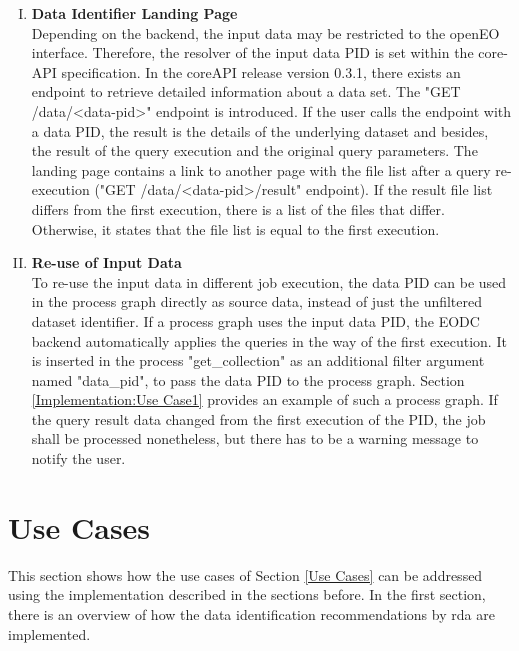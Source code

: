 \documentclass[draft,final]{vutinfth} %
\begin{document}
\begin{enumerate}[I.]
\item \textbf{Data Identifier Landing Page} \\
	Depending on the backend, the input data may be restricted to the openEO interface. Therefore, the resolver of the input data PID is set within the core-API specification. In the coreAPI release version 0.3.1, there exists an endpoint to retrieve detailed information about a data set. The "GET /data/<data-pid>" endpoint is introduced. If the user calls the endpoint with a data PID, the result is the details of the underlying dataset and besides, the result of the query execution and the original query parameters. The landing page contains a link to another page with the file list after a query re-execution ("GET /data/<data-pid>/result" endpoint). If the result file list differs from the first execution, there is a list of the files that differ. Otherwise, it states that the file list is equal to the first execution. 

\item \textbf{Re-use of Input Data} \\
	To re-use the input data in different job execution, the data PID can be used in the process graph directly as source data, instead of just the unfiltered dataset identifier. If a process graph uses the input data PID, the EODC backend automatically applies the queries in the way of the first execution. It is inserted in the process "get\_collection" as an additional filter argument named "data\_pid", to pass the data PID to the process graph. Section \ref{Implementation:Use Case1} provides an example of such a process graph. If the query result data changed from the first execution of the PID, the job shall be processed nonetheless, but there has to be a warning message to notify the user.  
\end{enumerate}

\section{Use Cases}
This section shows how the use cases of Section \ref{Use Cases} can be addressed using the implementation described in the sections before. In the first section, there is an overview of how the data identification recommendations by \acrshort{rda} are implemented. 
\end{document}
